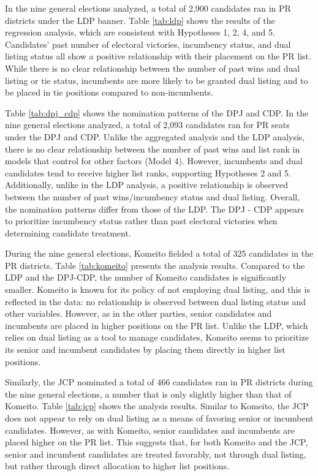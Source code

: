 \documentclass[a4paper, 11pt]{article}
\begin{document}
In the nine general elections analyzed, a total of 2,900 candidates ran in PR districts under the LDP banner. Table \ref{tab:ldp} shows the results of the regression analysis, which are consistent with Hypotheses 1, 2, 4, and 5. Candidates’ past number of electoral victories, incumbency status, and dual listing status all show a positive relationship with their placement on the PR list. While there is no clear relationship between the number of past wins and dual listing or tie status, incumbents are more likely to be granted dual listing and to be placed in tie positions compared to non-incumbents.



Table \ref{tab:dpj_cdp} shows the nomination patterns of the DPJ and CDP. In the nine general elections analyzed, a total of 2,093 candidates ran for PR seats under the DPJ and CDP. Unlike the aggregated analysis and the LDP analysis, there is no clear relationship between the number of past wins and list rank in models that control for other factors (Model 4). However, incumbents and dual candidates tend to receive higher list ranks, supporting Hypotheses 2 and 5. Additionally, unlike in the LDP analysis, a positive relationship is observed between the number of past wins/incumbency status and dual listing. Overall, the nomination patterns differ from those of the LDP. The DPJ - CDP appears to prioritize incumbency status rather than past electoral victories when determining candidate treatment.



During the nine general elections, Komeito fielded a total of 325 candidates in the PR districts. Table \ref{tab:komeito} presents the analysis results. Compared to the LDP and the DPJ-CDP, the number of Komeito candidates is significantly smaller. Komeito is known for its policy of not employing dual listing, and this is reflected in the data: no relationship is observed between dual listing status and other variables. However, as in the other parties, senior candidates and incumbents are placed in higher positions on the PR list. Unlike the LDP, which relies on dual listing as a tool to manage candidates, Komeito seems to prioritize its senior and incumbent candidates by placing them directly in higher list positions.

Similarly, the JCP nominated a total of 466 candidates ran in PR districts during the nine general elections, a number that is only slightly higher than that of Komeito. Table \ref{tab:jcp} shows the analysis results. Similar to Komeito, the JCP does not appear to rely on dual listing as a means of favoring senior or incumbent candidates. However, as with Komeito, senior candidates and incumbents are placed higher on the PR list. This suggests that, for both Komeito and the JCP, senior and incumbent candidates are treated favorably, not through dual listing, but rather through direct allocation to higher list positions.
\end{document}
